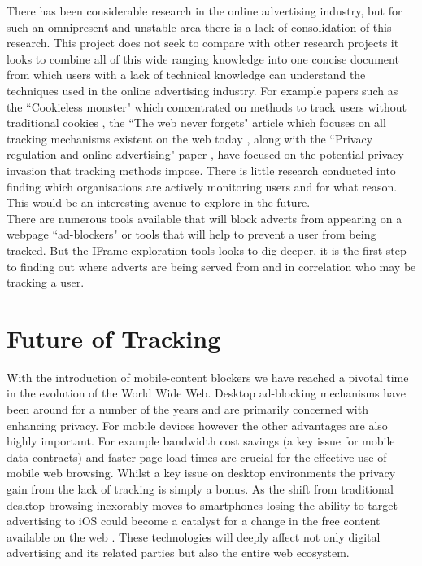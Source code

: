\documentclass[12pt]{article}
\begin{document}
There has been considerable research in the online advertising industry, but for such an omnipresent and unstable area there is a lack of consolidation of this research. This project does not seek to compare with other research projects it looks to combine all of this wide ranging knowledge into one concise document from which users with a lack of technical knowledge can understand the techniques used in the online advertising industry. For example papers such as the ``Cookieless monster" which concentrated on methods to track users without traditional cookies \parencite{cookielessMonster}, the ``The web never forgets" article which focuses on all tracking mechanisms existent on the web today \parencite{webNeverForgets}, along with the ``Privacy regulation and online advertising" paper \parencite{goldfarb2011privacy}, have focused on the potential privacy invasion that tracking methods impose. There is little research conducted into finding which organisations are actively monitoring users and for what reason. This would be an interesting avenue to explore in the future.  \\

There are numerous tools available that will block adverts from appearing on a webpage ``ad-blockers" or tools that will help to prevent a user from being tracked. But the IFrame exploration tools looks to dig deeper, it is the first step to finding out where adverts are being served from and in correlation who may be tracking a user. 

\pagebreak

\section{Future of Tracking}
With the introduction of mobile-content blockers we have reached a pivotal time in the evolution of the World Wide Web. Desktop ad-blocking mechanisms have been around for a number of the years and are primarily concerned with enhancing privacy. For mobile devices however the other advantages are also highly important. For example bandwidth cost savings (a key issue for mobile data contracts) and faster page load times are crucial for the effective use of mobile web browsing. Whilst a key issue on desktop environments the privacy gain from the lack of tracking is simply a bonus. As the shift from traditional desktop browsing inexorably moves to smartphones losing the ability to target advertising to iOS could become a catalyst for a change in the free content available on the web \parencite{tippingPoint}. These technologies will deeply affect not only digital advertising and its related parties but also the entire web ecosystem. \\
\end{document}
